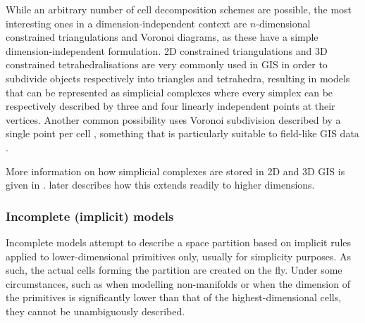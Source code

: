 While an arbitrary number of cell decomposition schemes are possible, the most interesting ones in a dimension-independent context are $n$-dimensional constrained triangulations and Voronoi diagrams, as these have a simple dimension-independent formulation.
2D constrained triangulations \citep{Chew89,Shewchuk96} and 3D constrained tetrahedralisations \citep{Si05} are very commonly used in GIS in order to subdivide objects respectively into triangles and tetrahedra, resulting in models that can be represented as simplicial complexes where every simplex can be respectively described by three and four linearly independent points at their vertices.
Another common possibility uses Voronoi subdivision described by a single point per cell \citep{Voronoi08}, something that is particularly suitable to field-like GIS data \citep{Ledoux06}.

More information on how simplicial complexes are stored in 2D and 3D GIS is given in .
 later describes how this extends readily to higher dimensions.

\subsubsection{Incomplete (implicit) models}

Incomplete models attempt to describe a space partition based on implicit rules applied to lower-dimensional primitives only, usually for simplicity purposes.
As such, the actual cells forming the partition are created on the fly.
Under some circumstances, such as when modelling non-manifolds or when the dimension of the primitives is significantly lower than that of the highest-dimensional cells, they cannot be unambiguously described.

